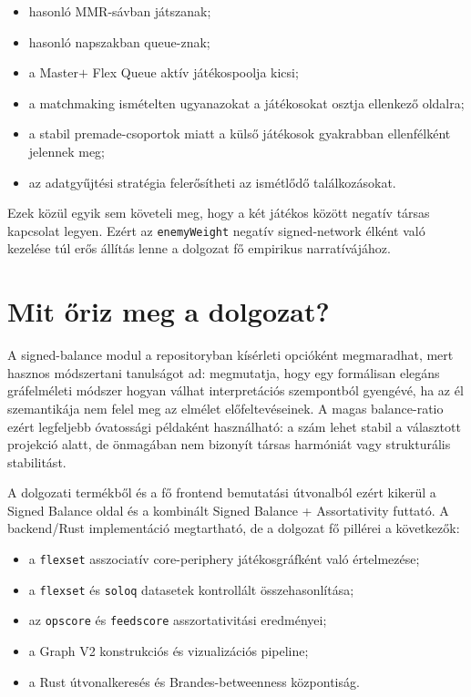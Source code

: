 \begin{itemize}
    \item hasonló MMR-sávban játszanak;
    \item hasonló napszakban queue-znak;
    \item a Master$+$ Flex Queue aktív játékospoolja kicsi;
    \item a matchmaking ismételten ugyanazokat a játékosokat osztja ellenkező oldalra;
    \item a stabil premade-csoportok miatt a külső játékosok gyakrabban ellenfélként jelennek meg;
    \item az adatgyűjtési stratégia felerősítheti az ismétlődő találkozásokat.
\end{itemize}

Ezek közül egyik sem követeli meg, hogy a két játékos között negatív társas kapcsolat legyen. Ezért az \texttt{enemyWeight} negatív signed-network élként való kezelése túl erős állítás lenne a dolgozat fő empirikus narratívájához.

\section{Mit őriz meg a dolgozat?}

A signed-balance modul a repositoryban kísérleti opcióként megmaradhat, mert hasznos módszertani tanulságot ad: megmutatja, hogy egy formálisan elegáns gráfelméleti módszer hogyan válhat interpretációs szempontból gyengévé, ha az él szemantikája nem felel meg az elmélet előfeltevéseinek. A magas balance-ratio ezért legfeljebb óvatossági példaként használható: a szám lehet stabil a választott projekció alatt, de önmagában nem bizonyít társas harmóniát vagy strukturális stabilitást.

A dolgozati termékből és a fő frontend bemutatási útvonalból ezért kikerül a Signed Balance oldal és a kombinált Signed Balance + Assortativity futtató. A backend/Rust implementáció megtartható, de a dolgozat fő pillérei a következők:

\begin{itemize}
    \item a \texttt{flexset} asszociatív core-periphery játékosgráfként való értelmezése;
    \item a \texttt{flexset} és \texttt{soloq} datasetek kontrollált összehasonlítása;
    \item az \texttt{opscore} és \texttt{feedscore} asszortativitási eredményei;
    \item a Graph V2 konstrukciós és vizualizációs pipeline;
    \item a Rust útvonalkeresés és Brandes-betweenness központiság.
\end{itemize}

